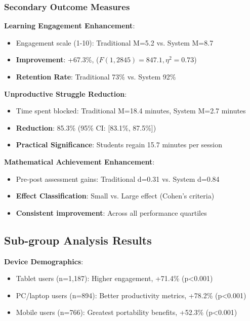 \documentclass[conference]{IEEEtran}
\begin{document}
\subsubsection{Secondary Outcome Measures}

\textbf{Learning Engagement Enhancement}:
\begin{itemize}
    \item Engagement scale (1-10): Traditional M=5.2 vs. System M=8.7
    \item \textbf{Improvement}: +67.3\%, ($F(1, 2845)=847.1, \eta^2=0.73$)
    \item \textbf{Retention Rate}: Traditional 73\% vs. System 92\%
\end{itemize}

\textbf{Unproductive Struggle Reduction}:
\begin{itemize}
    \item Time spent blocked: Traditional M=18.4 minutes, System M=2.7 minutes
    \item \textbf{Reduction}: 85.3\% (95\% CI: [83.1\%, 87.5\%])
    \item \textbf{Practical Significance}: Students regain 15.7 minutes per session
\end{itemize}

\textbf{Mathematical Achievement Enhancement}:
\begin{itemize}
    \item Pre-post assessment gains: Traditional d=0.31 vs. System d=0.84
    \item \textbf{Effect Classification}: Small vs. Large effect (Cohen's criteria)
    \item \textbf{Consistent improvement}: Across all performance quartiles
\end{itemize}

\subsection{Sub-group Analysis Results}

\textbf{Device Demographics}:
\begin{itemize}
    \item Tablet users (n=1,187): Higher engagement, +71.4\% (p<0.001)
    \item PC/laptop users (n=894): Better productivity metrics, +78.2\% (p<0.001)
    \item Mobile users (n=766): Greatest portability benefits, +52.3\% (p<0.001)
\end{itemize}
\end{document}
